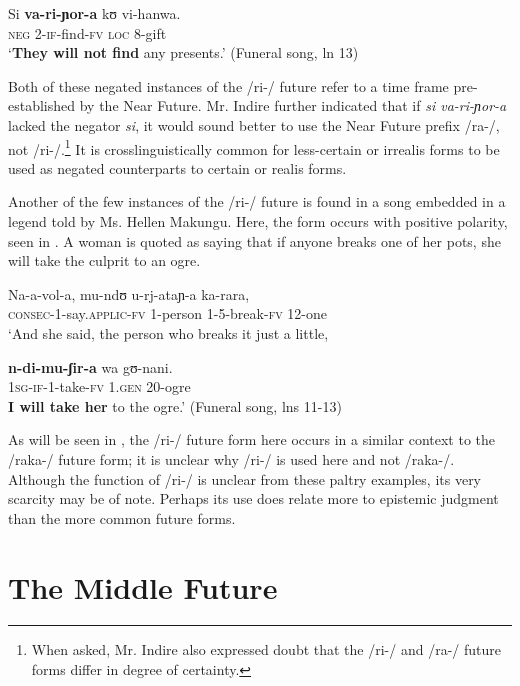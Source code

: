 \documentclass[output=paper]{langsci/langscibook}
\begin{document}
\ea\label{ex:sarvasy:10}
\gll Si   \textbf{va-ri-ɲor-a}   kʊ   vi-hanwa. \\
\textsc{neg}  2-\textsc{if-}find-\textsc{fv}  \textsc{loc}  8-gift \\
\glt ‘\textbf{They will not find} any presents.’ (Funeral song, ln 13)
\z

Both of these negated instances of the /ri-/ future refer to a time frame pre-established by the Near Future. Mr. Indire further indicated that if \textit{si va-ri-ɲor-a} lacked the negator \textit{si}, it would sound better to use the Near Future prefix /ra-/, not /ri-/.\footnote{When asked, Mr. Indire also expressed doubt that the /ri-/ and /ra-/ future forms differ in degree of certainty.} It is crosslinguistically common for less-certain or irrealis forms to be used as negated counterparts to certain or realis forms. 

Another of the few instances of the /ri-/ future is found in a song embedded in a legend told by Ms. Hellen Makungu. Here, the form occurs with positive polarity, seen in . A woman is quoted as saying that if anyone breaks one of her pots, she will take the culprit to an ogre.

\ea\label{ex:sarvasy:11}
\gll Na-a-vol-a,      mu-ndʊ  u-rj-ataɲ-a  ka-rara, \\
\textsc{consec-1}-say.\textsc{applic-fv}  1-person  1-5-break-\textsc{fv}  12-one \\
\glt ‘And she said, the person who breaks it just a little,

\gll \textbf{n-di-mu-ʃir-a}     wa   gʊ-nani. \\
\textsc{1sg-if-}1-take-\textsc{fv}  \textsc{1.gen}  20-ogre \\
\glt \textbf{I will take her} to the ogre.’ (Funeral song, lns 11-13)
\z

As will be seen in , the /ri-/ future form here occurs in a similar context to the /raka-/ future form; it is unclear why /ri-/ is used here and not /raka-/. Although the function of /ri-/ is unclear from these paltry examples, its very scarcity may be of note. Perhaps its use does relate more to epistemic judgment than the more common future forms.

\section{The Middle Future}
\end{document}
